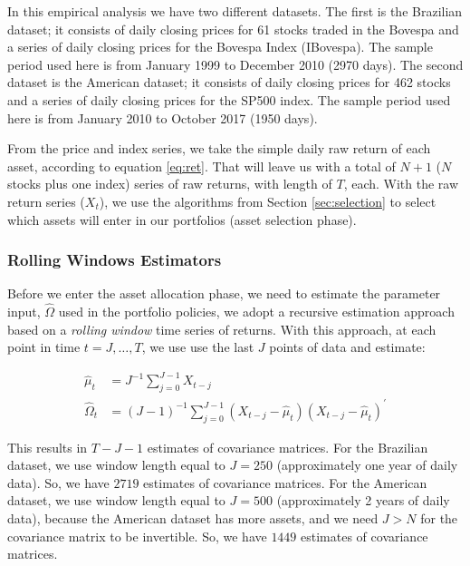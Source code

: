 \documentclass[12pt,oneside,a4paper]{memoir}
\begin{document}
In this empirical analysis we have two different datasets.
The first is the Brazilian dataset; it consists of daily closing prices for 61 stocks traded in the Bovespa and a series of daily closing prices for the Bovespa Index (IBovespa).
The sample period used here is from January 1999 to December 2010 (2970 days).
The second dataset is the American dataset; it consists of daily closing prices for 462 stocks and a series of daily closing prices for the SP500 index.
The sample period used here is from January 2010 to October 2017 (1950 days).

From the price and index series, we take the simple daily raw return of each asset, according to equation \eqref{eq:ret}.
That will leave us with a total of $N+1$ ($N$ stocks plus one index) series of raw returns, with length of $T$, each.
With the raw return series ($X_{t}$), we use the algorithms from Section \ref{sec:selection} to select which assets will enter in our portfolios (asset selection phase).

\subsubsection*{Rolling Windows Estimators}
Before we enter the asset allocation phase, we need to estimate the parameter input, $\hat{\Omega}$ used in the portfolio policies, we adopt a recursive estimation approach based on a \textit{rolling window} time series of returns.
With this approach, at each point in time $t=J, \dots, T$, we use use the last $J$ points of data and estimate:

\vspace{-18 pt}
\begin{align*}
	\hat{\mu}_{t} &=
	J^{-1} \sum^{J-1}_{j=0} X_{t-j}
	\\
	\hat{\Omega}_{t} &=
	(J-1)^{-1} \sum^{J-1}_{j=0}
	(X_{t-j} - \hat{\mu}_{t})(X_{t-j} - \hat{\mu}_{t})^{\prime}
\end{align*}

This results in $T-J-1$ estimates of covariance matrices.
For the Brazilian dataset, we use window length equal to $J=250$ (approximately one year of daily data).
So, we have $2719$ estimates of covariance matrices.
% 
For the American dataset, we use window length equal to $J=500$ (approximately 2 years of daily data), because the American dataset has more assets, and we need $J>N$ for the covariance matrix to be invertible.
So, we have $1449$ estimates of covariance matrices.
\end{document}
